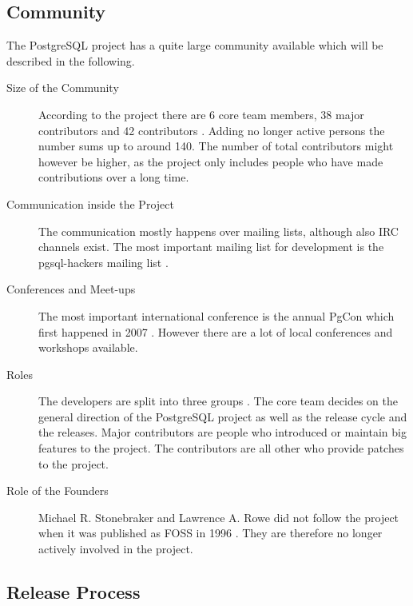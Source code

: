 \subsection{Community}

The PostgreSQL project has a quite large community available which will be
described in the following.

\begin{description}

  \item[Size of the Community] According to the project there are 6 core team
    members, 38 major contributors and 42 contributors
    \cite{PostgreSQLContributors}. Adding no longer active persons the number
    sums up to around 140. The number of total contributors might however be
    higher, as the project only includes people who have made contributions
    over a long time.

  \item[Communication inside the Project] The communication mostly happens over
    mailing lists, although also \ac{IRC} channels exist. The most important
    mailing list for development is the pgsql-hackers mailing list
    \cite{PostgreSQLDevFAQ}.

  \item[Conferences and Meet-ups] The most important international conference
    is the annual PgCon which first happened in 2007 \cite{PostgreSQLEvents}.
    However there are a lot of local conferences and workshops available.

  \item[Roles] The developers are split into three groups
    \cite{PostgreSQLContributors}. The core team decides on the general
    direction of the PostgreSQL project as well as the release cycle and the
    releases. Major contributors are people who introduced or maintain big
    features to the project. The contributors are all other who provide patches
    to the project.

  \item[Role of the Founders] Michael R. Stonebraker and Lawrence A. Rowe did
    not follow the project when it was published as \ac{FOSS} in 1996
    \cite{PostgreSQLHistory}. They are therefore no longer actively involved in
    the project.

\end{description}

\subsection{Release Process}

